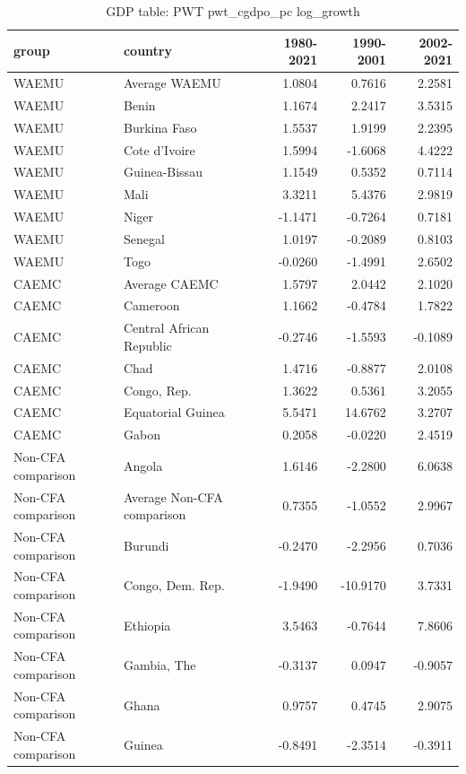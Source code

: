 \begin{table}

\caption{GDP table: PWT pwt_cgdpo_pc log_growth}
\centering
\begin{tabular}[t]{llrrr}
\toprule
group & country & 1980-2021 & 1990-2001 & 2002-2021\\
\midrule
WAEMU & Average WAEMU & 1.0804 & 0.7616 & 2.2581\\
WAEMU & Benin & 1.1674 & 2.2417 & 3.5315\\
WAEMU & Burkina Faso & 1.5537 & 1.9199 & 2.2395\\
WAEMU & Cote d'Ivoire & 1.5994 & -1.6068 & 4.4222\\
WAEMU & Guinea-Bissau & 1.1549 & 0.5352 & 0.7114\\
\addlinespace
WAEMU & Mali & 3.3211 & 5.4376 & 2.9819\\
WAEMU & Niger & -1.1471 & -0.7264 & 0.7181\\
WAEMU & Senegal & 1.0197 & -0.2089 & 0.8103\\
WAEMU & Togo & -0.0260 & -1.4991 & 2.6502\\
CAEMC & Average CAEMC & 1.5797 & 2.0442 & 2.1020\\
\addlinespace
CAEMC & Cameroon & 1.1662 & -0.4784 & 1.7822\\
CAEMC & Central African Republic & -0.2746 & -1.5593 & -0.1089\\
CAEMC & Chad & 1.4716 & -0.8877 & 2.0108\\
CAEMC & Congo, Rep. & 1.3622 & 0.5361 & 3.2055\\
CAEMC & Equatorial Guinea & 5.5471 & 14.6762 & 3.2707\\
\addlinespace
CAEMC & Gabon & 0.2058 & -0.0220 & 2.4519\\
Non-CFA comparison & Angola & 1.6146 & -2.2800 & 6.0638\\
Non-CFA comparison & Average Non-CFA comparison & 0.7355 & -1.0552 & 2.9967\\
Non-CFA comparison & Burundi & -0.2470 & -2.2956 & 0.7036\\
Non-CFA comparison & Congo, Dem. Rep. & -1.9490 & -10.9170 & 3.7331\\
\addlinespace
Non-CFA comparison & Ethiopia & 3.5463 & -0.7644 & 7.8606\\
Non-CFA comparison & Gambia, The & -0.3137 & 0.0947 & -0.9057\\
Non-CFA comparison & Ghana & 0.9757 & 0.4745 & 2.9075\\
Non-CFA comparison & Guinea & -0.8491 & -2.3514 & -0.3911\\

\end{tabular}
\end{table}
